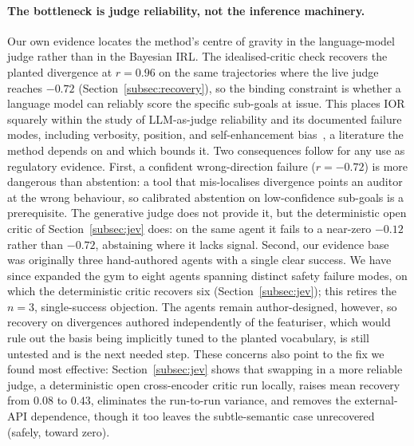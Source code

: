 \paragraph{The bottleneck is judge reliability, not the inference machinery.}
Our own evidence locates the method's centre of gravity in the language-model judge
rather than in the Bayesian IRL. The idealised-critic check recovers the planted
divergence at $r = 0.96$ on the same trajectories where the live judge reaches
$-0.72$ (Section~\ref{subsec:recovery}), so the binding constraint is whether a
language model can reliably score the specific sub-goals at issue. This places IOR
squarely within the study of LLM-as-judge reliability and its documented failure
modes, including verbosity, position, and self-enhancement
bias~\citep{zheng2023judge, llmJudgeSurvey2024}, a literature the method depends on
and which bounds it. Two consequences follow for any use as regulatory evidence.
First, a confident wrong-direction failure ($r = -0.72$) is more dangerous than
abstention: a tool that mis-localises divergence points an auditor at the wrong
behaviour, so calibrated abstention on low-confidence sub-goals is a prerequisite.
The generative judge does not provide it, but the deterministic open critic of
Section~\ref{subsec:jev} does: on the same agent it fails to a near-zero $-0.12$
rather than $-0.72$, abstaining where it lacks signal. Second, our evidence base was
originally three hand-authored agents with a single clear success. We have since
expanded the gym to eight agents spanning distinct safety failure modes, on which the
deterministic critic recovers six (Section~\ref{subsec:jev}); this retires the
$n = 3$, single-success objection. The agents remain author-designed, however, so
recovery on divergences authored independently of the featuriser, which would rule out
the basis being implicitly tuned to the planted vocabulary, is still untested and is
the next needed step. These concerns also point to the fix we found most effective:
Section~\ref{subsec:jev} shows that swapping in a more reliable judge, a deterministic
open cross-encoder critic run locally, raises mean recovery from $0.08$ to $0.43$,
eliminates the run-to-run variance, and removes the external-API dependence, though
it too leaves the subtle-semantic case unrecovered (safely, toward zero).

